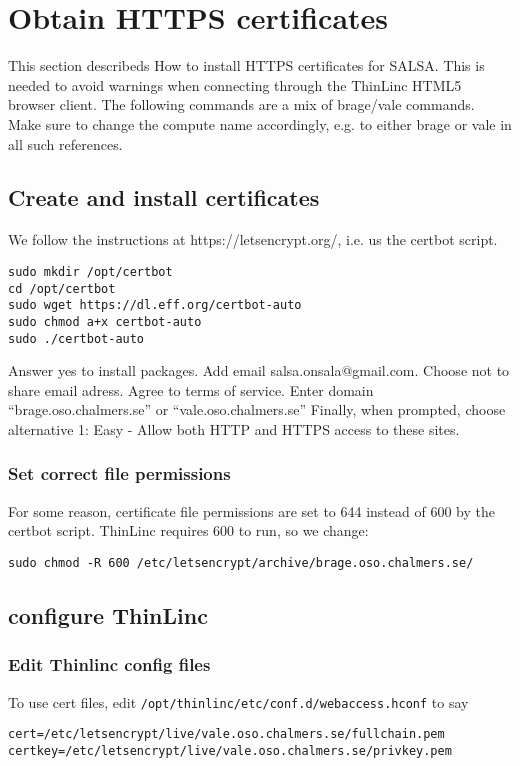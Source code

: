 \section{Obtain HTTPS certificates}
This section describeds How to install HTTPS certificates for SALSA. This
is needed to avoid warnings when connecting through the ThinLinc HTML5 
browser client. The following commands are a mix of brage/vale commands.
Make sure to change the compute name accordingly, e.g. to either brage
or vale in all such references.

\subsection{Create and install certificates}
We follow the instructions at https://letsencrypt.org/, i.e. us the certbot 
script.
\begin{verbatim}
sudo mkdir /opt/certbot
cd /opt/certbot
sudo wget https://dl.eff.org/certbot-auto
sudo chmod a+x certbot-auto
sudo ./certbot-auto
\end{verbatim}
Answer yes to install packages. Add email salsa.onsala@gmail.com. Choose not to
share email adress. Agree to terms of service.  Enter domain
“brage.oso.chalmers.se” or “vale.oso.chalmers.se” Finally, when prompted,
choose alternative 1: Easy - Allow both HTTP and HTTPS access to these sites.

\subsubsection{Set correct file permissions}
For some reason, certificate file permissions are set to 644
instead of 600 by the certbot script. ThinLinc requires 600 to run, so 
we change:
\begin{verbatim}
sudo chmod -R 600 /etc/letsencrypt/archive/brage.oso.chalmers.se/
\end{verbatim}

\subsection{configure ThinLinc}

\subsubsection{Edit Thinlinc config files}
To use cert files, edit
\verb!/opt/thinlinc/etc/conf.d/webaccess.hconf!
to say 
\begin{verbatim}
cert=/etc/letsencrypt/live/vale.oso.chalmers.se/fullchain.pem
certkey=/etc/letsencrypt/live/vale.oso.chalmers.se/privkey.pem
\end{verbatim}

